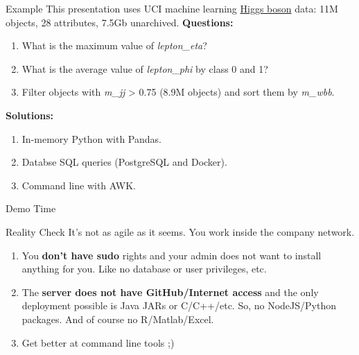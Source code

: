 \documentclass[unicode, notheorems, aspectratio=169]{beamer}
\begin{document}
\begin{frame}{Example}
This presentation uses UCI machine learning \href{http://archive.ics.uci.edu/ml/datasets/HIGGS}{Higgs boson} data: 11M objects, 28 attributes, 7.5Gb unarchived. 
\vfill
\textbf{Questions:}
\begin{enumerate}
\item What is the maximum value of \textit{lepton\_eta}?
\item What is the average value of \textit{lepton\_phi} by class 0 and 1?
\item Filter objects with \textit{m\_jj} > 0.75 (8.9M objects) and sort them by \textit{m\_wbb}.
\end{enumerate}
\vfill
\textbf{Solutions:}
\begin{enumerate}
\item In-memory Python with Pandas.
\item Databse SQL queries (PostgreSQL and Docker).
\item Command line with AWK.
\end{enumerate}
\end{frame}

\begin{frame}[noframenumbering]
	\begin{center}
		{\huge Demo Time}
	\end{center}
\end{frame}

\begin{frame}{Reality Check}
It's not as agile as it seems. You work inside the company network.
\vfill
\begin{enumerate}
\item You \textbf{don't have sudo} rights and your admin does not want to install anything for you. Like no database or user privileges, etc.
\item The \textbf{server does not have GitHub/Internet access} and the only deployment possible is Java JARs or C/C++/etc. So, no NodeJS/Python packages. And of course no R/Matlab/Excel.
\item Get better at command line tools ;)
\end{enumerate}
\end{frame}
\end{document}
